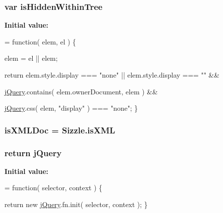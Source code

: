 \subsubsection[{\texorpdfstring{is\+Hidden\+Within\+Tree}{isHiddenWithinTree}}]{\setlength{\rightskip}{0pt plus 5cm}var is\+Hidden\+Within\+Tree}\hypertarget{jquery-3_82_81_8js_af3806910c58966c00b0b1e2fd2ae2fd5}{}\label{jquery-3_82_81_8js_af3806910c58966c00b0b1e2fd2ae2fd5}
{\bfseries Initial value\+:}
\begin{DoxyCode}
= \textcolor{keyword}{function}( elem, el ) \{

        
        
        elem = el || elem;

        
        \textcolor{keywordflow}{return} elem.style.display === \textcolor{stringliteral}{"none"} ||
            elem.style.display === \textcolor{stringliteral}{""} &&

            
            
            
            
            \hyperlink{jquery-3_82_81_8js_a609525712f1102566c2b03866ceb2bba}{jQuery}.contains( elem.ownerDocument, elem ) &&

            \hyperlink{jquery-3_82_81_8js_a609525712f1102566c2b03866ceb2bba}{jQuery}.css( elem, \textcolor{stringliteral}{"display"} ) === \textcolor{stringliteral}{"none"};
    \}
\end{DoxyCode}
\subsubsection[{\texorpdfstring{is\+X\+M\+L\+Doc}{isXMLDoc}}]{ is\+X\+M\+L\+Doc = Sizzle.\+is\+X\+ML}\hypertarget{jquery-3_82_81_8js_acf4730466ce2c301378ee112fdba9139}{}\label{jquery-3_82_81_8js_acf4730466ce2c301378ee112fdba9139}
\subsubsection[{\texorpdfstring{j\+Query}{jQuery}}]{\setlength{\rightskip}{0pt plus 5cm}return j\+Query}\hypertarget{jquery-3_82_81_8js_a609525712f1102566c2b03866ceb2bba}{}\label{jquery-3_82_81_8js_a609525712f1102566c2b03866ceb2bba}
{\bfseries Initial value\+:}
\begin{DoxyCode}
= \textcolor{keyword}{function}( selector, context ) \{

        
        
        \textcolor{keywordflow}{return} \textcolor{keyword}{new} \hyperlink{jquery-3_82_81_8js_a609525712f1102566c2b03866ceb2bba}{jQuery}.fn.init( selector, context );
    \}
\end{DoxyCode}
